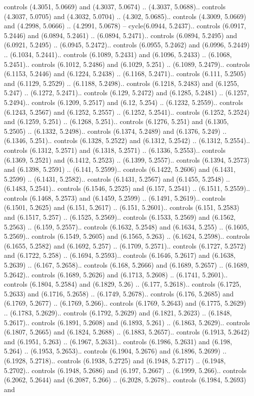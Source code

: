 controls (4.3051, 5.0669) and (4.3037, 5.0674) .. (4.3037, 5.0688).. controls (4.3037, 5.0705) and (4.3032, 5.0704) .. (4.302, 5.0685).. controls (4.3009, 5.0669) and (4.2998, 5.0666) .. (4.2991, 5.0678) -- cycle(6.0944, 5.2437).. controls (6.0917, 5.2446) and (6.0894, 5.2461) .. (6.0894, 5.2471).. controls (6.0894, 5.2495) and (6.0921, 5.2495) .. (6.0945, 5.2472).. controls (6.0955, 5.2462) and (6.0996, 5.2449) .. (6.1034, 5.2441).. controls (6.1089, 5.2431) and (6.1096, 5.2433) .. (6.1068, 5.2451).. controls (6.1012, 5.2486) and (6.1029, 5.251) .. (6.1089, 5.2479).. controls (6.1153, 5.2446) and (6.1224, 5.2438) .. (6.1168, 5.2471).. controls (6.111, 5.2505) and (6.1129, 5.2529) .. (6.1188, 5.2498).. controls (6.1218, 5.2483) and (6.1255, 5.247) .. (6.1272, 5.2471).. controls (6.129, 5.2472) and (6.1285, 5.2481) .. (6.1257, 5.2494).. controls (6.1209, 5.2517) and (6.12, 5.254) .. (6.1232, 5.2559).. controls (6.1243, 5.2567) and (6.1252, 5.2557) .. (6.1252, 5.2541).. controls (6.1252, 5.2524) and (6.1259, 5.251) .. (6.1268, 5.251).. controls (6.1276, 5.251) and (6.1305, 5.2505) .. (6.1332, 5.2498).. controls (6.1374, 5.2489) and (6.1376, 5.249) .. (6.1346, 5.251).. controls (6.1328, 5.2522) and (6.1312, 5.2542) .. (6.1312, 5.2554).. controls (6.1312, 5.2571) and (6.1318, 5.2571) .. (6.1336, 5.2553).. controls (6.1369, 5.2521) and (6.1412, 5.2523) .. (6.1399, 5.2557).. controls (6.1394, 5.2573) and (6.1398, 5.2591) .. (6.141, 5.2599).. controls (6.1422, 5.2606) and (6.1431, 5.2599) .. (6.1431, 5.2582).. controls (6.1431, 5.2567) and (6.1455, 5.2548) .. (6.1483, 5.2541).. controls (6.1546, 5.2525) and (6.157, 5.2541) .. (6.1511, 5.2559).. controls (6.1468, 5.2573) and (6.1459, 5.2599) .. (6.1491, 5.2619).. controls (6.1501, 5.2625) and (6.151, 5.2617) .. (6.151, 5.2601).. controls (6.151, 5.2583) and (6.1517, 5.257) .. (6.1525, 5.2569).. controls (6.1533, 5.2569) and (6.1562, 5.2563) .. (6.159, 5.2557).. controls (6.1632, 5.2548) and (6.1634, 5.255) .. (6.1605, 5.2569).. controls (6.1549, 5.2605) and (6.1565, 5.263) .. (6.1624, 5.2598).. controls (6.1655, 5.2582) and (6.1692, 5.257) .. (6.1709, 5.2571).. controls (6.1727, 5.2572) and (6.1722, 5.258) .. (6.1694, 5.2593).. controls (6.1646, 5.2617) and (6.1638, 5.2639) .. (6.167, 5.2658).. controls (6.168, 5.2666) and (6.1689, 5.2657) .. (6.1689, 5.2642).. controls (6.1689, 5.2626) and (6.1713, 5.2608) .. (6.1741, 5.2601).. controls (6.1804, 5.2584) and (6.1829, 5.26) .. (6.177, 5.2618).. controls (6.1725, 5.2633) and (6.1716, 5.2658) .. (6.1749, 5.2678).. controls (6.176, 5.2685) and (6.1769, 5.2677) .. (6.1769, 5.266).. controls (6.1769, 5.2643) and (6.1775, 5.2629) .. (6.1783, 5.2629).. controls (6.1792, 5.2629) and (6.1821, 5.2623) .. (6.1848, 5.2617).. controls (6.1891, 5.2608) and (6.1893, 5.261) .. (6.1863, 5.2629).. controls (6.1807, 5.2665) and (6.1824, 5.2688) .. (6.1883, 5.2657).. controls (6.1913, 5.2642) and (6.1951, 5.263) .. (6.1967, 5.2631).. controls (6.1986, 5.2631) and (6.198, 5.264) .. (6.1953, 5.2653).. controls (6.1904, 5.2676) and (6.1896, 5.2699) .. (6.1928, 5.2718).. controls (6.1938, 5.2725) and (6.1948, 5.2717) .. (6.1948, 5.2702).. controls (6.1948, 5.2686) and (6.197, 5.2667) .. (6.1999, 5.266).. controls (6.2062, 5.2644) and (6.2087, 5.266) .. (6.2028, 5.2678).. controls (6.1984, 5.2693) and 